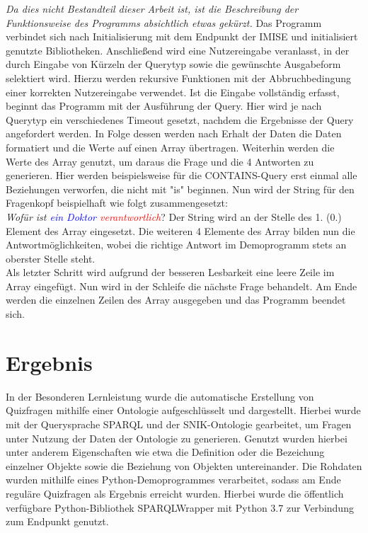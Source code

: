 \documentclass[headsepline,titlepage,ngerman,twoside,12pt]{report}
\newcommand\todo[1]{}%
\begin{document}
\textit{Da dies nicht Bestandteil dieser Arbeit ist, ist die Beschreibung der Funktionsweise des Programms absichtlich etwas gekürzt.}
Das Programm verbindet sich nach Initialisierung mit dem Endpunkt der IMISE und initialisiert genutzte Bibliotheken.
Anschließend wird eine Nutzereingabe veranlasst, in der durch Eingabe von Kürzeln der Querytyp sowie die gewünschte Ausgabeform selektiert wird.
Hierzu werden rekursive Funktionen mit der Abbruchbedingung einer korrekten Nutzereingabe verwendet.
Ist die Eingabe vollständig erfasst, beginnt das Programm mit der Ausführung der Query.
Hier wird je nach Querytyp ein verschiedenes Timeout gesetzt, nachdem die Ergebnisse der Query angefordert werden.
In Folge dessen werden nach Erhalt der Daten die Daten formatiert und die Werte auf einen Array übertragen.
Weiterhin werden die Werte des Array genutzt, um daraus die Frage und die 4 Antworten zu generieren.
Hier werden beispielsweise für die CONTAINS-Query erst einmal alle Beziehungen verworfen, die nicht mit "is" beginnen.
Nun wird der String für den Fragenkopf beispielhaft wie folgt zusammengesetzt:\\
\textit{Wofür ist \textcolor{blue}{ein Doktor} \textcolor{red}{verantwortlich}}?
Der String wird an der Stelle des 1. (0.) Element des Array eingesetzt.
Die weiteren 4 Elemente des Array bilden nun die Antwortmöglichkeiten, wobei die richtige Antwort im Demoprogramm stets an oberster Stelle steht. \\
Als letzter Schritt wird aufgrund der besseren Lesbarkeit eine leere Zeile im Array eingefügt.
Nun wird in der Schleife die nächste Frage behandelt.
Am Ende werden die einzelnen Zeilen des Array ausgegeben und das Programm beendet sich.


\chapter{Ergebnis}
\todo{
Im Ergebniskapitel soll beschrieben werden, inwiefern Sie Ihre in 1.2/1.3 aufgestellten Ziele bzw. Aufgaben erreicht habe oder auch weshalb sie (teilweise) nicht erreicht werden konnten.
So soll es möglich sein, dass ein Leser von der Arbeit lediglich die Einleitung und die Zusammenfassung liest und doch die Ergebnisse der Arbeit erfassen kann.
Dieses Kapitel kann auch in mehrere Unterkapitel aufgeteilt werden, wenn das sinnvoll ist!
}

In der Besonderen Lernleistung wurde die automatische Erstellung von Quizfragen mithilfe einer Ontologie aufgeschlüsselt und dargestellt.
Hierbei wurde mit der Querysprache SPARQL und der SNIK-Ontologie gearbeitet, um Fragen unter Nutzung der Daten der Ontologie zu generieren.
Genutzt wurden hierbei unter anderem Eigenschaften wie etwa die Definition oder die Bezeichung einzelner Objekte sowie die Beziehung von Objekten untereinander.
Die Rohdaten wurden mithilfe eines Python-Demoprogrammes verarbeitet, sodass am Ende reguläre Quizfragen als Ergebnis erreicht wurden.
Hierbei wurde die öffentlich verfügbare Python-Bibliothek SPARQLWrapper mit Python 3.7 zur Verbindung zum Endpunkt genutzt.
\end{document}
